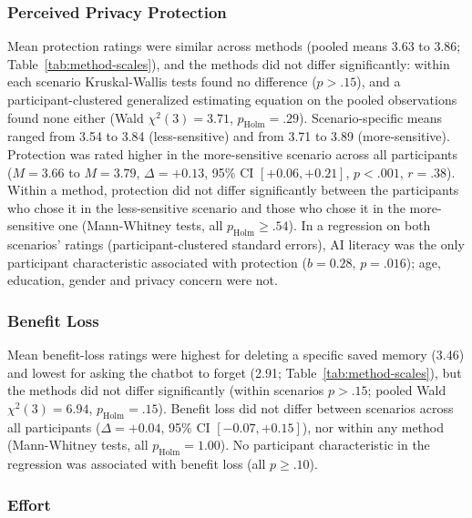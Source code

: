 \documentclass[conference,compsoc]{IEEEtran}
\begin{document}
\subsubsection{Perceived Privacy Protection}

Mean protection ratings were similar across methods (pooled means 3.63 to 3.86; Table~\ref{tab:method-scales}), and the methods did not differ significantly: within each scenario Kruskal-Wallis tests found no difference ($p>.15$), and a participant-clustered generalized estimating equation on the pooled observations found none either (Wald $\chi^2(3)=3.71$, $p_{\mathrm{Holm}}=.29$). Scenario-specific means ranged from 3.54 to 3.84 (less-sensitive) and from 3.71 to 3.89 (more-sensitive). Protection was rated higher in the more-sensitive scenario across all participants ($M=3.66$ to $M=3.79$, $\Delta=+0.13$, 95\% CI $[+0.06, +0.21]$, $p<.001$, $r=.38$). Within a method, protection did not differ significantly between the participants who chose it in the less-sensitive scenario and those who chose it in the more-sensitive one (Mann-Whitney tests, all $p_{\mathrm{Holm}}\geq.54$). In a regression on both scenarios' ratings (participant-clustered standard errors), AI literacy was the only participant characteristic associated with protection ($b=0.28$, $p=.016$); age, education, gender and privacy concern were not.

\subsubsection{Benefit Loss}

Mean benefit-loss ratings were highest for deleting a specific saved memory (3.46) and lowest for asking the chatbot to forget (2.91; Table~\ref{tab:method-scales}), but the methods did not differ significantly (within scenarios $p>.15$; pooled Wald $\chi^2(3)=6.94$, $p_{\mathrm{Holm}}=.15$). Benefit loss did not differ between scenarios across all participants ($\Delta=+0.04$, 95\% CI $[-0.07, +0.15]$), nor within any method (Mann-Whitney tests, all $p_{\mathrm{Holm}}=1.00$). No participant characteristic in the regression was associated with benefit loss (all $p\geq.10$).

\subsubsection{Effort}
\end{document}
